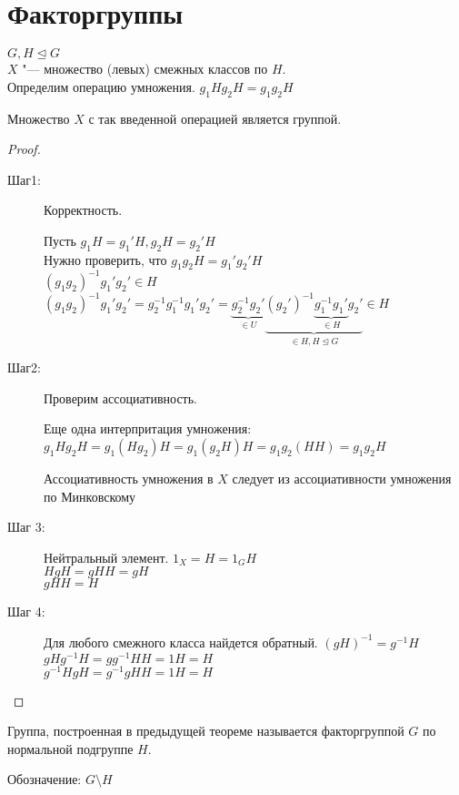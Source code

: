 ﻿\section{Факторгруппы}
$G, H \unlhd G$\\
$X$ "--- множество (левых) смежных классов по $H$.\\
Определим операцию умножения. 
$g_1H g_2H = g_1g_2H$
\begin{theorem}
Множество $X$ с так введенной операцией является группой. 
\end{theorem}
\begin{proof}
\begin{description}
\item[Шаг1:]
Корректность. 

Пусть $g_1H = g_1'H, g_2H = g_2'H$\\
Нужно проверить, что $g_1g_2H = g_1'g_2'H$\\

$(g_1g_2)^{-1}g_1'g_2' \in H$\\
$(g_1g_2)^{-1}g_1'g_2' = g_2^{-1}g_1^{-1}g_1'g_2' = \underbrace{g_2^{-1}g_2'}_{\in U} \underbrace{(g_2')^{-1} \underbrace{g_1^{-1}g_1'}_{\in H}g_2'}_{\in H, H \unlhd G} \in H$\\
\item [Шаг2:]
Проверим ассоциативность.

Еще одна интерпритация умножения:
$g_1Hg_2H = g_1(Hg_2)H = g_1(g_2H)H = g_1g_2(HH) = g_1g_2H$


Ассоциативность умножения в $X$ следует  из ассоциативности умножения по Минковскому\\
\item [Шаг 3:]
Нейтральный элемент. 
$1_X = H = 1_GH$\\
$HgH = gHH = gH$\\
$gHH = H$\\
\item [Шаг 4:]
Для любого смежного класса найдется обратный. 
$(gH)^{-1} = g^{-1}H$\\
$gHg^{-1}H = gg^{-1}HH = 1H = H$\\
$g^{-1}HgH = g^{-1}gHH = 1H = H$\\
\end{description}
\end{proof}
\begin{Def}
Группа, построенная в предыдущей теореме называется факторгруппой $G$ по нормальной подгруппе $H$.

Обозначение: $G \setminus H$\\
\end{Def}

